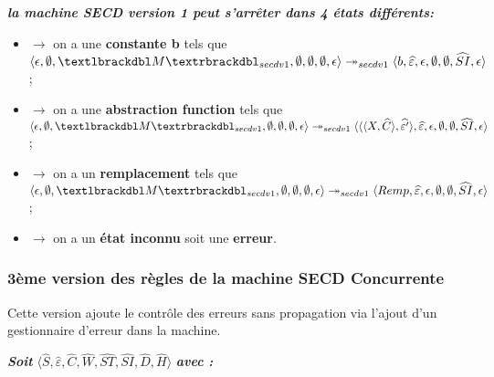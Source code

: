 \documentclass[10pt,a4paper]{article}
\begin{document}
				
				\textbf{\textit{la machine SECD version 1 peut s'arrêter dans 4 états différents:}}
				\smallbreak
				\begin{itemize}
					\item[]$\longrightarrow$ on a une \textbf{constante b} tels que $\langle \epsilon,\emptyset,\textlbrackdbl M\textrbrackdbl_{secdv1},\emptyset,\emptyset,\emptyset,\epsilon\rangle \twoheadrightarrow_{secdv1} \langle b,\widehat{\varepsilon},\epsilon,\emptyset,\emptyset,\widehat{SI},\epsilon\rangle$;
					\item[]$\longrightarrow$ on a une \textbf{abstraction function} tels que $\langle \epsilon,\emptyset,\textlbrackdbl M\textrbrackdbl_{secdv1},\emptyset,\emptyset,\emptyset,\epsilon\rangle \twoheadrightarrow_{secdv1} \langle\langle\langle X,\widehat{C}\rangle,\widehat{\varepsilon'}\rangle,\widehat{\varepsilon},\epsilon,\emptyset,\emptyset,\widehat{SI},\epsilon\rangle$;
					\item[]$\longrightarrow$ on a un \textbf{remplacement} tels que $\langle \epsilon,\emptyset,\textlbrackdbl M\textrbrackdbl_{secdv1},\emptyset,\emptyset,\emptyset,\epsilon\rangle \twoheadrightarrow_{secdv1} \langle Remp,\widehat{\varepsilon},\epsilon,\emptyset,\emptyset,\widehat{SI},\epsilon\rangle$;
					\item[]$\longrightarrow$ on a un \textbf{état inconnu} soit une \textbf{erreur}.
				\end{itemize}
				\newpage
				
				
				\subsubsection{3ème version des règles de la machine SECD Concurrente}\label{SECDConc3}
					\smallbreak
					Cette version ajoute le contrôle des erreurs sans propagation via l'ajout d'un gestionnaire d'erreur dans la machine.
					\bigbreak
					
					\textbf{\textit{Soit}} $\langle\widehat{S},\widehat{\varepsilon},\widehat{C},\widehat{W},\widehat{ST},\widehat{SI},\widehat{D},\widehat{H}\rangle$ \textbf{\textit{avec :}}
				
\end{document}
